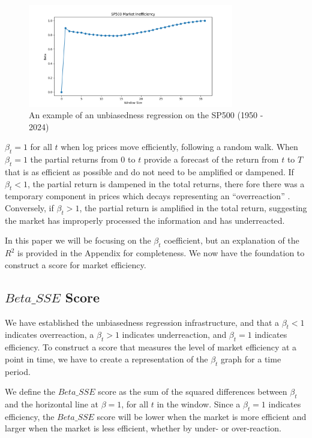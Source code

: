 \begin{figure}[h!]
    \centering
    \includegraphics[width=0.8\textwidth]{../figs/SP500 Market Inefficiency.png}
    \caption{An example of an unbiasedness regression on the SP500 (1950 - 2024)}
    \label{fig:sp_500_unbiasedness}
\end{figure}

$\beta_t = 1$ for all $t$ when log prices move efficiently, following a random walk. When 
$\beta_t = 1$ the partial returns from $0$ to $t$ provide a forecast of the return from $t$ to $T$ \citep{mincer_zarnowitz_1969}
 that is as efficient as possible and do not need to be amplified or dampened. 
 If $\beta_t < 1$, the partial return is dampened in the total returns, there fore there was a temporary component in prices which decays representing an “overreaction” \citep{barclay_hendershott_2003}.
Conversely, if $\beta_t > 1$, the partial return is amplified in the total return, suggesting the market has improperly processed the information and has underreacted.

In this paper we will be focusing on the $\beta_t$ coefficient, but an explanation of the $R^2$ is provided in the Appendix for completeness. 
We now have the foundation to construct a score for market efficiency.

\subsection{$Beta\_SSE$ Score}

We have established the unbiasedness regression infrastructure, and that a $\beta_t < 1$ indicates overreaction, a $\beta_t > 1$ indicates underreaction, and $\beta_t = 1$ indicates efficiency.
To construct a score that measures the level of market efficiency at a point in time, we have to create a representation of the $\beta_t$ graph for a time period.

We define the $Beta\_SSE$ score as the sum of the squared differences between $\beta_t$ and the horizontal line at $\beta = 1$, for all $t$ in the window.
Since a $\beta_t = 1$ indicates efficiency, the $Beta\_SSE$ score will be lower when the market is more efficient and larger when the market is less efficient, whether by under- or over-reaction.

